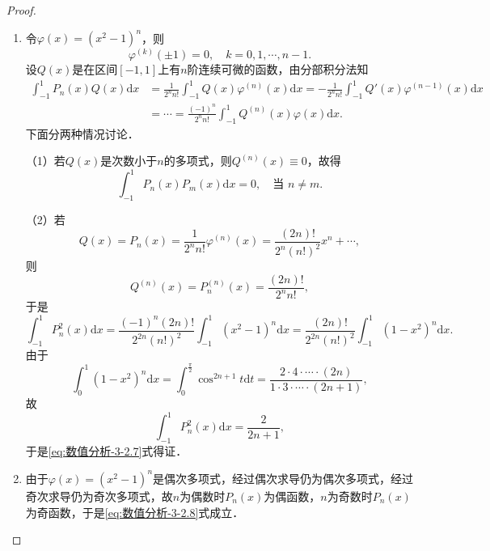 \documentclass[../../main.tex]{subfiles}
\begin{document}
\begin{proof}
\begin{enumerate}
\item 令$\varphi(x) = (x^2 - 1)^n$，则
$$\varphi^{(k)}(\pm 1) = 0,\quad k = 0,1,\cdots,n-1.$$
设$Q(x)$是在区间$[-1,1]$上有$n$阶连续可微的函数，由分部积分法知
\begin{align*}
\int_{-1}^1 P_n(x)Q(x)\mathrm{d}x &= \frac{1}{2^n n!}\int_{-1}^1 Q(x)\varphi^{(n)}(x)\mathrm{d}x = -\frac{1}{2^n n!}\int_{-1}^1 Q'(x)\varphi^{(n-1)}(x)\mathrm{d}x \\
&= \cdots = \frac{(-1)^n}{2^n n!}\int_{-1}^1 Q^{(n)}(x)\varphi(x)\mathrm{d}x.
\end{align*}
下面分两种情况讨论．

（1）若$Q(x)$是次数小于$n$的多项式，则$Q^{(n)}(x) \equiv 0$，故得
$$\int_{-1}^1 P_n(x)P_m(x)\mathrm{d}x = 0,\quad \text{当 } n \neq m.$$

（2）若
$$Q(x) = P_n(x) = \frac{1}{2^n n!}\varphi^{(n)}(x) = \frac{(2n)!}{2^n (n!)^2}x^n + \cdots,$$
则
$$Q^{(n)}(x) = P_n^{(n)}(x) = \frac{(2n)!}{2^n n!},$$
于是
$$\int_{-1}^1 P_n^2(x)\mathrm{d}x = \frac{(-1)^n (2n)!}{2^{2n} (n!)^2}\int_{-1}^1 (x^2 - 1)^n \mathrm{d}x = \frac{(2n)!}{2^{2n} (n!)^2}\int_{-1}^1 (1 - x^2)^n \mathrm{d}x.$$
由于
$$\int_{0}^1 (1 - x^2)^n \mathrm{d}x = \int_{0}^{\frac{\pi}{2}} \cos^{2n+1}t \mathrm{d}t = \frac{2 \cdot 4 \cdot \cdots \cdot (2n)}{1 \cdot 3 \cdot \cdots \cdot (2n+1)},$$
故
$$\int_{-1}^1 P_n^2(x)\mathrm{d}x = \frac{2}{2n+1},$$
于是\eqref{eq:数值分析-3-2.7}式得证．

\item 由于$\varphi(x) = (x^2 - 1)^n$是偶次多项式，经过偶次求导仍为偶次多项式，经过奇次求导仍为奇次多项式，故$n$为偶数时$P_n(x)$为偶函数，$n$为奇数时$P_n(x)$为奇函数，于是\eqref{eq:数值分析-3-2.8}式成立．


\end{enumerate}
\end{proof}
\end{document}
